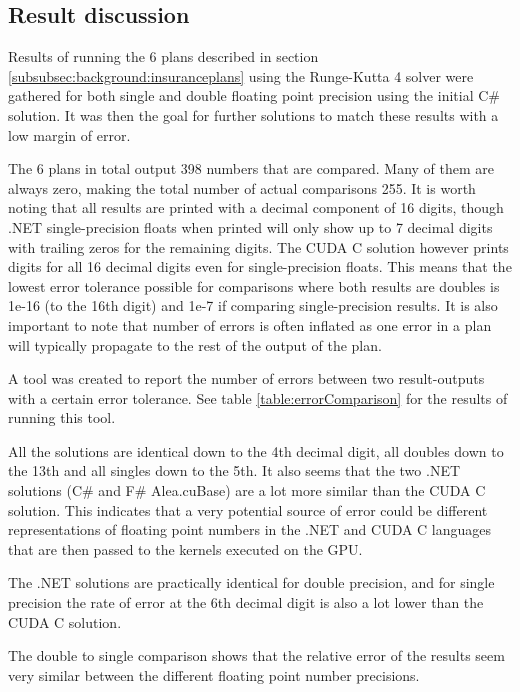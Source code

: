 \subsection{Result discussion}\label{subsec:result_comparison}
Results of running the 6 plans described in section \ref{subsubsec:background:insuranceplans} using the Runge-Kutta 4 solver were gathered for both single and double floating point precision using the initial C\# solution.
It was then the goal for further solutions to match these results with a low margin of error.

The 6 plans in total output 398 numbers that are compared. 
Many of them are always zero, making the total number of actual comparisons 255.
It is worth noting that all results are printed with a decimal component of 16 digits, though .NET single-precision floats when printed will only show up to 7 decimal digits with trailing zeros for the remaining digits.
The CUDA C solution however prints digits for all 16 decimal digits even for single-precision floats.
This means that the lowest error tolerance possible for comparisons where both results are doubles is 1e-16 (to the 16th digit) and 1e-7 if comparing single-precision results.
It is also important to note that number of errors is often inflated as one error in a plan will typically propagate to the rest of the output of the plan.

A tool was created to report the number of errors between two result-outputs with a certain error tolerance.
See table \ref{table:errorComparison} for the results of running this tool.

All the solutions are identical down to the 4th decimal digit, all doubles down to the 13th and all singles down to the 5th.
It also seems that the two .NET solutions (C\# and F\# Alea.cuBase) are a lot more similar than the CUDA C solution.
This indicates that a very potential source of error could be different representations of floating point numbers in the .NET and CUDA C languages that are then passed to the kernels executed on the GPU.

The .NET solutions are practically identical for double precision, and for single precision the rate of error at the 6th decimal digit is also a lot lower than the CUDA C solution.

The double to single comparison shows that the relative error of the results seem very similar between the different floating point number precisions.


